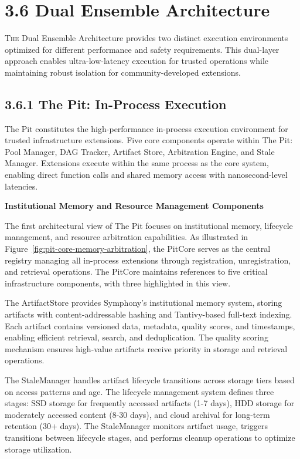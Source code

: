 \clearpage
\section{3.6 Dual Ensemble Architecture}
\label{sec:dual-ensemble}

\lettrine{T}{he} Dual Ensemble Architecture provides two distinct execution environments optimized for different performance and safety requirements. This dual-layer approach enables ultra-low-latency execution for trusted operations while maintaining robust isolation for community-developed extensions.

\subsection*{3.6.1 The Pit: In-Process Execution}

The Pit constitutes the high-performance in-process execution environment for trusted infrastructure extensions. Five core components operate within The Pit: Pool Manager, DAG Tracker, Artifact Store, Arbitration Engine, and Stale Manager. Extensions execute within the same process as the core system, enabling direct function calls and shared memory access with nanosecond-level latencies.

\textbf{Institutional Memory and Resource Management Components}

The first architectural view of The Pit focuses on institutional memory, lifecycle management, and resource arbitration capabilities. As illustrated in Figure~\ref{fig:pit-core-memory-arbitration}, the PitCore serves as the central registry managing all in-process extensions through registration, unregistration, and retrieval operations. The PitCore maintains references to five critical infrastructure components, with three highlighted in this view.

The ArtifactStore provides Symphony's institutional memory system, storing artifacts with content-addressable hashing and Tantivy-based full-text indexing. Each artifact contains versioned data, metadata, quality scores, and timestamps, enabling efficient retrieval, search, and deduplication. The quality scoring mechanism ensures high-value artifacts receive priority in storage and retrieval operations.

The StaleManager handles artifact lifecycle transitions across storage tiers based on access patterns and age. The lifecycle management system defines three stages: SSD storage for frequently accessed artifacts (1-7 days), HDD storage for moderately accessed content (8-30 days), and cloud archival for long-term retention (30+ days). The StaleManager monitors artifact usage, triggers transitions between lifecycle stages, and performs cleanup operations to optimize storage utilization.

